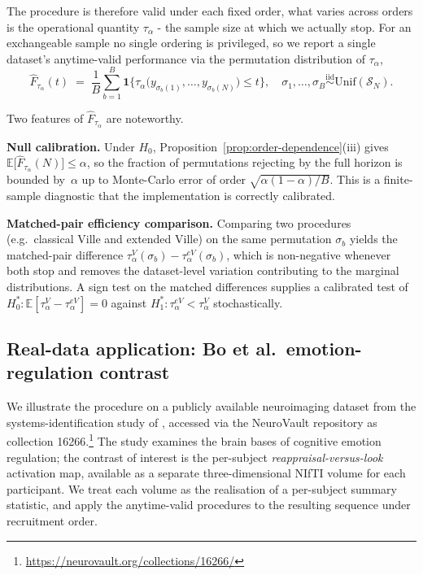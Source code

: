 \documentclass[numsec,webpdf,modern,medium,namedate]{oup-authoring-template}
\theoremstyle{thmstyleone}%
\theoremstyle{thmstyletwo}%
\theoremstyle{thmstylethree}%
\newcommand{\1}{\mathbf{1}}
\begin{document}
The procedure is therefore valid under each fixed order, what varies across orders is the operational quantity $\tau_{\alpha}$ - the sample size at which we actually stop. For an exchangeable sample no single ordering is privileged, so we report a single dataset's anytime-valid performance via the permutation distribution of $\tau_{\alpha}$,
\begin{equation}\label{eq:perm-cdf}
   \widehat{F}_{\tau_{\alpha}}(t) \;=\; \frac{1}{B}\sum_{b=1}^{B}\mathbf{1}\bigl\{\tau_{\alpha}\bigl(y_{\sigma_{b}(1)},\ldots,y_{\sigma_{b}(N)}\bigr)\le t\bigr\}, \quad \sigma_{1},\ldots,\sigma_{B}\stackrel{\mathrm{iid}}{\sim}\mathrm{Unif}(\mathcal{S}_{N}).
\end{equation}

Two features of $\widehat{F}_{\tau_{\alpha}}$ are noteworthy.

\textbf{Null calibration.} Under $H_{0}$, Proposition~\ref{prop:order-dependence}(iii) gives $\mathbb{E}\bigl[\widehat{F}_{\tau_{\alpha}}(N)\bigr]\le\alpha$, so the fraction of permutations rejecting by the full horizon is bounded by~$\alpha$ up to Monte-Carlo error of order $\sqrt{\alpha(1-\alpha)/B}$. This is a finite-sample diagnostic that the implementation is correctly calibrated.

\textbf{Matched-pair efficiency comparison.} Comparing two procedures (e.g.\ classical Ville and extended Ville) on the same permutation $\sigma_{b}$ yields the matched-pair difference $\tau_{\alpha}^{V}(\sigma_{b})-\tau_{\alpha}^{eV}(\sigma_{b})$, which is non-negative whenever both stop and removes the dataset-level variation contributing to the marginal distributions. A sign test on the matched differences supplies a calibrated test of $H_{0}^{*}\colon\mathbb{E}[\tau_{\alpha}^{V}-\tau_{\alpha}^{eV}]=0$ against $H_{1}^{*}\colon\tau_{\alpha}^{eV}<\tau_{\alpha}^{V}$ stochastically.

\subsection{Real-data application: Bo et al.\ emotion-regulation contrast}
\label{sec:neurovault}
We illustrate the procedure on a publicly available neuroimaging dataset from
the systems-identification study of \cite{bo2024systems}, accessed via the
NeuroVault repository \citep{gorgolewski2015neurovault} as collection
\textsc{16266}.\footnote{\url{https://neurovault.org/collections/16266/}} The
study examines the brain bases of cognitive emotion regulation; the
contrast of interest is the per-subject \emph{reappraisal-versus-look}
activation map, available as a separate three-dimensional NIfTI volume for
each participant. We treat each volume as the realisation of a per-subject
summary statistic, and apply the anytime-valid procedures to the resulting
sequence under recruitment order.
\end{document}
